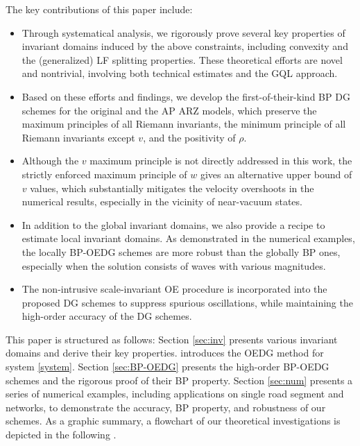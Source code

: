 \documentclass[times,final]{elsarticle}
\numberwithin{equation}{section}
\theoremstyle{definition}
\theoremstyle{remark}
\begin{document}
The key contributions of this paper include: 
\begin{itemize}[leftmargin=3mm]
	
	\item Through systematical analysis, we rigorously prove several key properties of invariant domains induced by the above constraints, including convexity and the (generalized) LF splitting properties. These theoretical efforts are novel and nontrivial, involving both technical estimates and the GQL approach.
	
	\item Based on these efforts and findings, we develop the first-of-their-kind BP DG schemes for the original and the AP ARZ models, which preserve the maximum principles of all Riemann invariants, the minimum principle of all Riemann invariants except $v$, and the positivity of $\rho$. 
	
	\item Although the $v$ maximum principle is not directly addressed in this work, the strictly enforced maximum principle of $w$ gives an alternative upper bound of $v$ values, which substantially mitigates the velocity overshoots in the numerical results, especially in the vicinity of near-vacuum states. 
	
	\item In addition to the global invariant domains, we also provide a recipe to estimate local invariant domains. As demonstrated in the numerical examples, the locally BP-OEDG schemes are more robust than the globally BP ones, especially when the solution consists of waves with various magnitudes.
	
	\item The non-intrusive scale-invariant OE procedure \cite{peng2023oedg} is incorporated into the proposed DG schemes to suppress spurious oscillations, while maintaining the high-order accuracy of the DG schemes. 
	
\end{itemize}

This paper is structured as follows: 
Section \ref{sec:inv} presents various invariant domains and derive their key properties. 
 introduces the OEDG method for system \eqref{system}. 
Section \ref{sec:BP-OEDG} presents the high-order BP-OEDG schemes and the rigorous proof of their BP property. 
Section \ref{sec:num} presents a series of numerical examples, including applications on single road segment and networks, to demonstrate the accuracy, BP property,  and robustness of our schemes. 
As a graphic summary, a flowchart of our theoretical investigations is depicted in the following .
\end{document}
